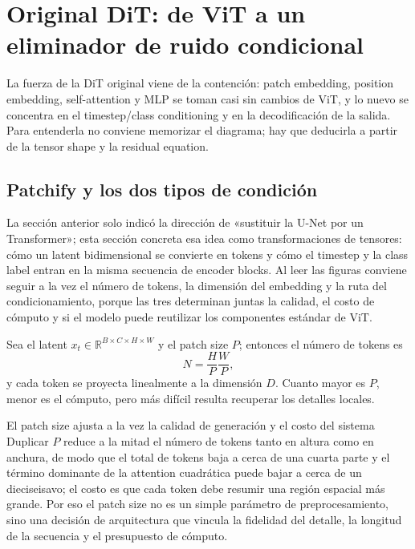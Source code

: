 \section{Original DiT: de ViT a un eliminador de ruido condicional}

La fuerza de la DiT original viene de la contención: patch embedding, position embedding, self-attention y MLP se toman casi sin cambios de ViT, y lo nuevo se concentra en el timestep/class conditioning y en la decodificación de la salida. Para entenderla no conviene memorizar el diagrama; hay que deducirla a partir de la tensor shape y la residual equation.

\subsection{Patchify y los dos tipos de condición}

La sección anterior solo indicó la dirección de «sustituir la U-Net por un Transformer»; esta sección concreta esa idea como transformaciones de tensores: cómo un latent bidimensional se convierte en tokens y cómo el timestep y la class label entran en la misma secuencia de encoder blocks. Al leer las figuras conviene seguir a la vez el número de tokens, la dimensión del embedding y la ruta del condicionamiento, porque las tres determinan juntas la calidad, el costo de cómputo y si el modelo puede reutilizar los componentes estándar de ViT.

Sea el latent $x_t\in\mathbb R^{B\times C\times H\times W}$ y el patch size $P$; entonces el número de tokens es
\[
N=\frac{H}{P}\frac{W}{P},
\]
y cada token se proyecta linealmente a la dimensión $D$. Cuanto mayor es $P$, menor es el cómputo, pero más difícil resulta recuperar los detalles locales.

\begin{knowledgebox}{El patch size ajusta a la vez la calidad de generación y el costo del sistema}
Duplicar $P$ reduce a la mitad el número de tokens tanto en altura como en anchura, de modo que el total de tokens baja a cerca de una cuarta parte y el término dominante de la attention cuadrática puede bajar a cerca de un dieciseisavo; el costo es que cada token debe resumir una región espacial más grande. Por eso el patch size no es un simple parámetro de preprocesamiento, sino una decisión de arquitectura que vincula la fidelidad del detalle, la longitud de la secuencia y el presupuesto de cómputo.
\end{knowledgebox}


